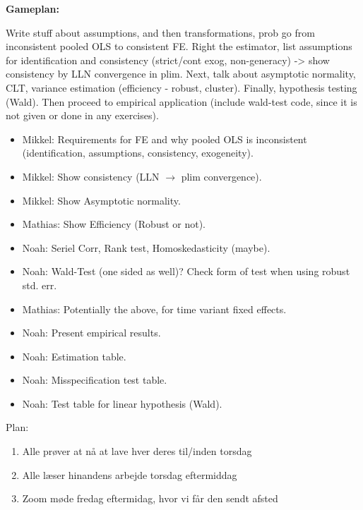 \textbf{Gameplan:}

Write stuff about assumptions, and then transformations, prob go from inconsistent pooled OLS to consistent FE. Right the estimator, list assumptions for identification and consistency (strict/cont exog, non-generacy) -> show consistency by LLN convergence in plim. Next, talk about asymptotic normality, CLT, variance estimation (efficiency - robust, cluster). Finally, hypothesis testing (Wald). Then proceed to empirical application (include wald-test code, since it is not given or done in any exercises).

\begin{itemize}
    \item Mikkel: Requirements for FE and why pooled OLS is inconsistent (identification, assumptions, consistency, exogeneity). 
    \item Mikkel: Show consistency (LLN $\to$ plim convergence). 
    \item Mikkel: Show Asymptotic normality.
    \item Mathias: Show Efficiency (Robust or not).
    \item Noah: Seriel Corr, Rank test, Homoskedasticity (maybe). 
    \item Noah: Wald-Test (one sided as well)? Check form of test when using robust std. err. 
    \item Mathias: Potentially the above, for time variant fixed effects.
    \item Noah: Present empirical results. 
    \item Noah: Estimation table. 
    \item Noah: Misspecification test table.
    \item Noah: Test table for linear hypothesis (Wald). 
\end{itemize}

Plan:
\begin{enumerate}
    \item Alle prøver at nå at lave hver deres til/inden torsdag
    \item Alle læser hinandens arbejde torsdag eftermiddag
    \item Zoom møde fredag eftermidag, hvor vi får den sendt afsted
\end{enumerate}